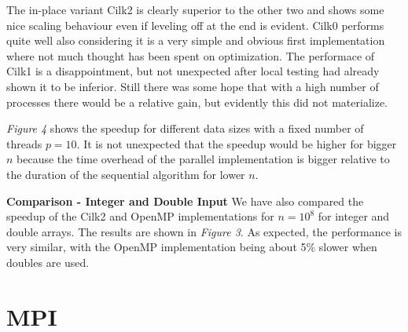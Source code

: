 \documentclass[12pt,a4paper]{article}
\begin{document}
The in-place variant Cilk2 is clearly superior to the other two and shows some nice scaling behaviour even if leveling off at the end is evident. Cilk0 performs quite well also considering it is a very simple and obvious first implementation where not much thought has been spent on optimization. The performace of Cilk1 is a disappointment, but not unexpected after local testing had already shown it to be inferior. Still there was some hope that with a high number of processes there would be a relative gain, but evidently this did not materialize.

\emph{Figure 4} shows the speedup for different data sizes with a fixed number of threads $p=10$. It is not unexpected that the speedup would be higher for bigger $n$ because the time overhead of the parallel implementation is bigger relative to the duration of the sequential algorithm for lower $n$.\newline

\noindent\textbf{Comparison - Integer and Double Input}\newline
We have also compared the speedup of the Cilk2 and OpenMP implementations for $n=10^{8}$ for integer and double arrays. The results are shown in \emph{Figure 3}. As expected, the performance is very similar, with the OpenMP implementation being about 5\% slower when doubles are used.

\FloatBarrier

\section{MPI}
\end{document}
